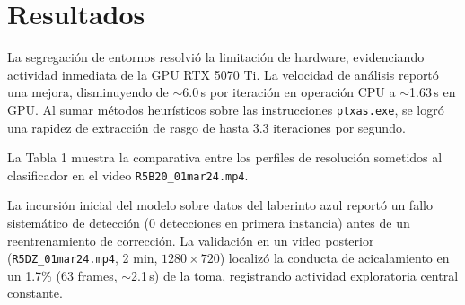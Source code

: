 \documentclass[12pt,a4paper]{article}
\begin{document}
\section{Resultados}

La segregación de entornos resolvió la limitación de hardware, evidenciando actividad inmediata de la GPU RTX 5070 Ti. La velocidad de análisis reportó una mejora, disminuyendo de $\sim$6.0\,s por iteración en operación CPU a $\sim$1.63\,s en GPU. Al sumar métodos heurísticos sobre las instrucciones \texttt{ptxas.exe}, se logró una rapidez de extracción de rasgo de hasta 3.3 iteraciones por segundo.

La Tabla 1 muestra la comparativa entre los perfiles de resolución sometidos al clasificador en el video \texttt{R5B20\_01mar24.mp4}. 

\begin{table}[h]
\centering
\caption{Comparativa de Resultados Analíticos SimBA sobre Video R5B20 (\textit{Thresholds} variados)}
\end{table}

La incursión inicial del modelo sobre datos del laberinto azul reportó un fallo sistemático de detección (0 detecciones en primera instancia) antes de un reentrenamiento de corrección. La validación en un video posterior (\texttt{R5DZ\_01mar24.mp4}, 2 min, $1280\times720$) localizó la conducta de acicalamiento en un 1.7\% (63 frames, $\sim$2.1\,s) de la toma, registrando actividad exploratoria central constante.

\end{document}
